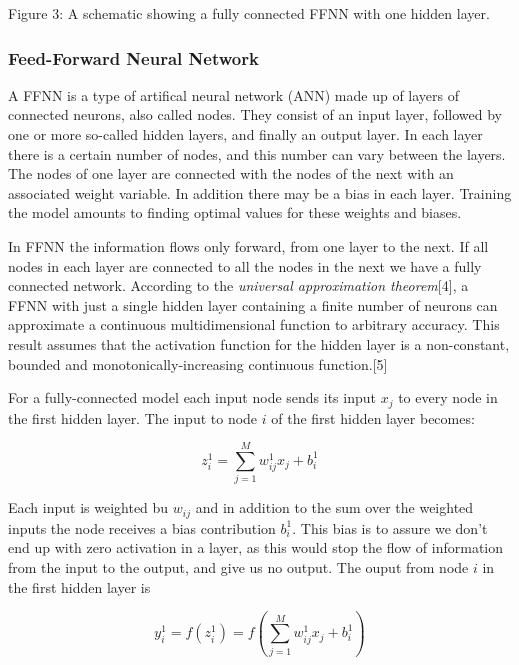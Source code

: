 \documentclass[11pt]{article}
\begin{document}
    Figure 3: A schematic showing a fully connected FFNN with one hidden
layer.

    \hypertarget{feed-forward-neural-network}{%
\subsubsection{Feed-Forward Neural
Network}\label{feed-forward-neural-network}}

A FFNN is a type of artifical neural network (ANN) made up of layers of
connected neurons, also called nodes. They consist of an input layer,
followed by one or more so-called hidden layers, and finally an output
layer. In each layer there is a certain number of nodes, and this number
can vary between the layers. The nodes of one layer are connected with
the nodes of the next with an associated weight variable. In addition
there may be a bias in each layer. Training the model amounts to finding
optimal values for these weights and biases.

In FFNN the information flows only forward, from one layer to the next.
If all nodes in each layer are connected to all the nodes in the next we
have a fully connected network. According to the \emph{universal
approximation theorem}{[}4{]}, a FFNN with just a single hidden layer
containing a finite number of neurons can approximate a continuous
multidimensional function to arbitrary accuracy. This result assumes
that the activation function for the hidden layer is a non-constant,
bounded and monotonically-increasing continuous function.{[}5{]}

For a fully-connected model each input node sends its input \(x_j\) to
every node in the first hidden layer. The input to node \(i\) of the
first hidden layer becomes:


\begin{equation} z_i^1 = \sum_{j=1}^{M} w_{ij}^1 x_j + b_i^1
\end{equation}


    Each input is weighted bu \(w_{ij}\) and in addition to the sum over the
weighted inputs the node receives a bias contribution \(b_i^1\). This
bias is to assure we don't end up with zero activation in a layer, as
this would stop the flow of information from the input to the output,
and give us no output. The ouput from node \(i\) in the first hidden
layer is


\begin{equation}
 y_i^1 = f(z_i^1) = f\left(\sum_{j=1}^M w_{ij}^1 x_j  + b_i^1\right)
\end{equation}
\end{document}
